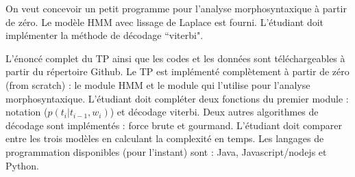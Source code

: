 \documentclass{KodeBook}
\begin{document}
On veut concevoir un petit programme pour l'analyse morphosyntaxique à partir de zéro. 
Le modèle HMM avec lissage de Laplace est fourni.
L'étudiant doit implémenter la méthode de décodage ``viterbi".

L'énoncé complet du TP ainsi que les codes et les données sont téléchargeables à partir du répertoire Github.
Le TP est implémenté complètement à partir de zéro (from scratch) : le module HMM et le module qui l'utilise pour l'analyse morphosyntaxique. 
L'étudiant doit compléter deux fonctions du premier module : notation ($p(t_i|t_{i-1}, w_i)$) et décodage viterbi.
Deux autres algorithmes de décodage sont implémentés : force brute et gourmand.
L'étudiant doit comparer entre les trois modèles en calculant la complexité en temps.
Les langages de programmation disponibles (pour l'instant) sont : Java, Javascript/nodejs et Python.

%
%

\ifx\wholebook\relax\else
% 
% 
	
\end{document}
